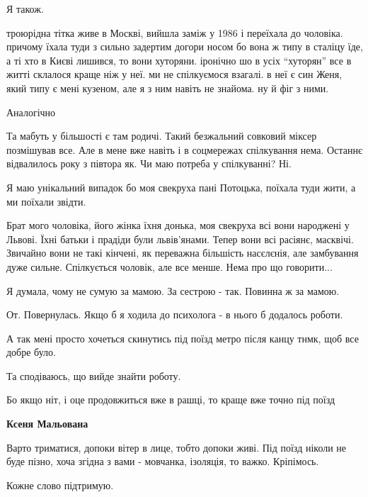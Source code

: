 \begin{itemize}
Я також.


троюрідна тітка живе в Москві, вийшла заміж у 1986 і переїхала до чоловіка.
причому їхала туди з сильно задертим догори носом бо вона ж типу в сталіцу їде,
а ті хто в Києві лишився, то вони хуторяни. іронічно шо в усіх \enquote{хуторян} все в
житті склалося краще ніж у неї. ми не спілкуємося взагалі. в неї є син Женя,
який типу є мені кузеном, але я з ним навіть не знайома. ну й фіг з ними.

Аналогічно


Та мабуть у більшості є там родичі. Такий безжальний совковий міксер позмішував
все. Але в мене вже навіть і в соцмережах спілкування нема. Останнє відвалилось
року з півтора як. Чи маю потреба у спілкуванні? Ні.


Я маю унікальний випадок бо моя свекруха пані Потоцька, поїхала туди жити, а ми
поїхали звідти.

Брат мого чоловіка, його жінка їхня донька, моя свекруха всі вони народжені у
Львові. Їхні батьки і прадіди були львів'янами. Тепер вони всі расіянє,
масквічі. Звичайно вони не такі кінчені, як переважна більшість насєлєнія, але
замбування дуже сильне. Спілкується чоловік, але все менше. Нема про що
говорити...


Я думала, чому не сумую за мамою. За сестрою - так. Повинна ж за мамою.

От. Повернулась. Якщо б я ходила до психолога - в нього б додалось роботи.

А так мені просто хочеться скинутись під поїзд метро після канцу тнмк, щоб все
добре було.

Та сподіваюсь, що вийде знайти роботу.

Бо якщо ніт, і оце продовжиться вже в рашці, то краще вже точно під поїзд

\begin{itemize} %
\textbf{Ксеня Мальована} 

Варто триматися, допоки вітер в лице, тобто допоки живі. Під поїзд ніколи не
буде пізно, хоча згідна з вами - мовчанка, ізоляція, то важко. Кріпімось.

\end{itemize} %

Кожне слово підтримую.


\end{itemize}
